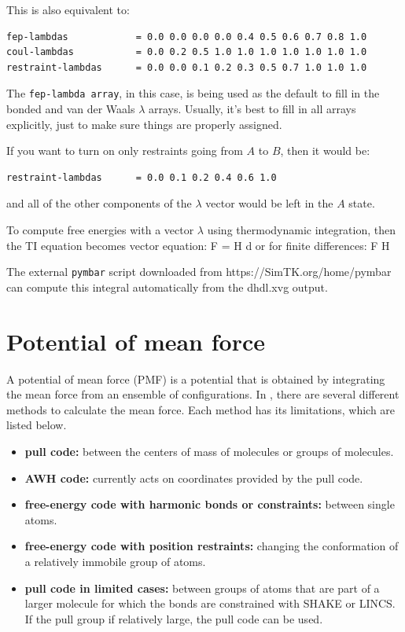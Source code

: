 This is also equivalent to:

\begin{verbatim}
fep-lambdas            = 0.0 0.0 0.0 0.0 0.4 0.5 0.6 0.7 0.8 1.0
coul-lambdas           = 0.0 0.2 0.5 1.0 1.0 1.0 1.0 1.0 1.0 1.0
restraint-lambdas      = 0.0 0.0 0.1 0.2 0.3 0.5 0.7 1.0 1.0 1.0
\end{verbatim}
The {\tt fep-lambda array}, in this case, is being used as the default to
fill in the bonded and van der Waals $\lambda$ arrays.  Usually, it's best to fill
in all arrays explicitly, just to make sure things are properly
assigned.

If you want to turn on only restraints going from $A$ to $B$, then it would be:
\begin{verbatim}
restraint-lambdas      = 0.0 0.1 0.2 0.4 0.6 1.0
\end{verbatim}
and all of the other components of the $\lambda$ vector would be left in the $A$ state.

To compute free energies with a vector $\lambda$ using
thermodynamic integration, then the TI equation becomes vector equation:
\beq
\Delta F = \int \langle \nabla H \rangle \cdot d\vec{\lambda}
\eeq
or for finite differences:
\beq
\Delta F \approx \int \sum \langle \nabla H \rangle \cdot \Delta\lambda
\eeq

The external {\tt pymbar} script downloaded from https://SimTK.org/home/pymbar can
compute this integral automatically from the {\gromacs} dhdl.xvg output.

\section{Potential of mean force}

A potential of mean force (PMF) is a potential that is obtained
by integrating the mean force from an ensemble of configurations.
In {\gromacs}, there are several different methods to calculate the mean force.
Each method has its limitations, which are listed below.
\begin{itemize}
\item{\bf pull code:} between the centers of mass of molecules or groups of molecules.
\item{\bf AWH code:} currently acts on coordinates provided by the pull code. 
\item{\bf free-energy code with harmonic bonds or constraints:} between single atoms. 
\item{\bf free-energy code with position restraints:} changing the conformation of a relatively immobile group of atoms.
\item{\bf pull code in limited cases:} between groups of atoms that are
part of a larger molecule for which the bonds are constrained with
SHAKE or LINCS. If the pull group if relatively large,
the pull code can be used.
\end{itemize}

